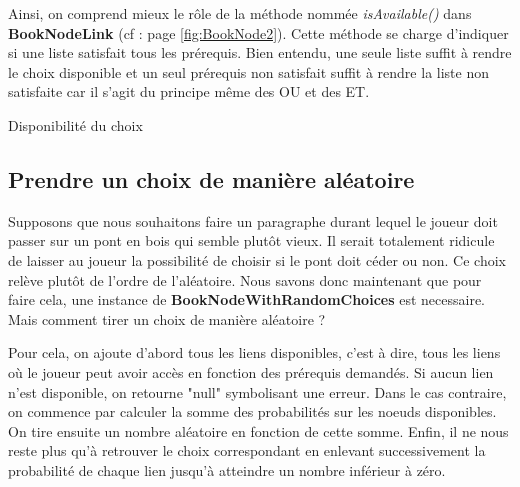 			Ainsi, on comprend mieux le rôle de la méthode nommée \textit{isAvailable()} dans \textbf{BookNodeLink} (cf :  page \ref{fig:BookNode2}). Cette méthode se charge d'indiquer si une liste satisfait tous les prérequis. Bien entendu, une seule liste suffit à rendre le choix disponible et un seul prérequis non satisfait suffit à rendre la liste non satisfaite car il s'agit du principe même des OU et des ET.


			\begin{algorithm}[H]
				\DontPrintSemicolon

				\;
				\;

				\caption{Disponibilité du choix}
			\end{algorithm}

		\subsection{Prendre un choix de manière aléatoire}

			Supposons que nous souhaitons faire un paragraphe durant lequel le joueur doit passer sur un pont en bois qui semble plutôt vieux. Il serait totalement ridicule de laisser au joueur la possibilité de choisir si le pont doit céder ou non. Ce choix relève plutôt de l'ordre de l'aléatoire. Nous savons donc maintenant que pour faire cela, une instance de \textbf{BookNodeWithRandomChoices} est necessaire. Mais comment tirer un choix de manière aléatoire ?

			Pour cela, on ajoute d'abord tous les liens disponibles, c'est à dire, tous les liens où le joueur peut avoir accès en fonction des prérequis demandés. Si aucun lien n'est disponible, on retourne "null" symbolisant une erreur. Dans le cas contraire, on commence par calculer la somme des probabilités sur les noeuds disponibles. On tire ensuite un nombre aléatoire en fonction de cette somme. Enfin, il ne nous reste plus qu'à retrouver le choix correspondant en enlevant successivement la probabilité de chaque lien jusqu'à atteindre un nombre inférieur à zéro.

